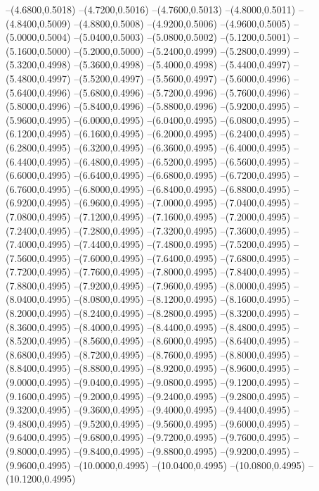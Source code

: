 {	--(4.6800,0.5018)
	--(4.7200,0.5016)
	--(4.7600,0.5013)
	--(4.8000,0.5011)
	--(4.8400,0.5009)
	--(4.8800,0.5008)
	--(4.9200,0.5006)
	--(4.9600,0.5005)
	--(5.0000,0.5004)
	--(5.0400,0.5003)
	--(5.0800,0.5002)
	--(5.1200,0.5001)
	--(5.1600,0.5000)
	--(5.2000,0.5000)
	--(5.2400,0.4999)
	--(5.2800,0.4999)
	--(5.3200,0.4998)
	--(5.3600,0.4998)
	--(5.4000,0.4998)
	--(5.4400,0.4997)
	--(5.4800,0.4997)
	--(5.5200,0.4997)
	--(5.5600,0.4997)
	--(5.6000,0.4996)
	--(5.6400,0.4996)
	--(5.6800,0.4996)
	--(5.7200,0.4996)
	--(5.7600,0.4996)
	--(5.8000,0.4996)
	--(5.8400,0.4996)
	--(5.8800,0.4996)
	--(5.9200,0.4995)
	--(5.9600,0.4995)
	--(6.0000,0.4995)
	--(6.0400,0.4995)
	--(6.0800,0.4995)
	--(6.1200,0.4995)
	--(6.1600,0.4995)
	--(6.2000,0.4995)
	--(6.2400,0.4995)
	--(6.2800,0.4995)
	--(6.3200,0.4995)
	--(6.3600,0.4995)
	--(6.4000,0.4995)
	--(6.4400,0.4995)
	--(6.4800,0.4995)
	--(6.5200,0.4995)
	--(6.5600,0.4995)
	--(6.6000,0.4995)
	--(6.6400,0.4995)
	--(6.6800,0.4995)
	--(6.7200,0.4995)
	--(6.7600,0.4995)
	--(6.8000,0.4995)
	--(6.8400,0.4995)
	--(6.8800,0.4995)
	--(6.9200,0.4995)
	--(6.9600,0.4995)
	--(7.0000,0.4995)
	--(7.0400,0.4995)
	--(7.0800,0.4995)
	--(7.1200,0.4995)
	--(7.1600,0.4995)
	--(7.2000,0.4995)
	--(7.2400,0.4995)
	--(7.2800,0.4995)
	--(7.3200,0.4995)
	--(7.3600,0.4995)
	--(7.4000,0.4995)
	--(7.4400,0.4995)
	--(7.4800,0.4995)
	--(7.5200,0.4995)
	--(7.5600,0.4995)
	--(7.6000,0.4995)
	--(7.6400,0.4995)
	--(7.6800,0.4995)
	--(7.7200,0.4995)
	--(7.7600,0.4995)
	--(7.8000,0.4995)
	--(7.8400,0.4995)
	--(7.8800,0.4995)
	--(7.9200,0.4995)
	--(7.9600,0.4995)
	--(8.0000,0.4995)
	--(8.0400,0.4995)
	--(8.0800,0.4995)
	--(8.1200,0.4995)
	--(8.1600,0.4995)
	--(8.2000,0.4995)
	--(8.2400,0.4995)
	--(8.2800,0.4995)
	--(8.3200,0.4995)
	--(8.3600,0.4995)
	--(8.4000,0.4995)
	--(8.4400,0.4995)
	--(8.4800,0.4995)
	--(8.5200,0.4995)
	--(8.5600,0.4995)
	--(8.6000,0.4995)
	--(8.6400,0.4995)
	--(8.6800,0.4995)
	--(8.7200,0.4995)
	--(8.7600,0.4995)
	--(8.8000,0.4995)
	--(8.8400,0.4995)
	--(8.8800,0.4995)
	--(8.9200,0.4995)
	--(8.9600,0.4995)
	--(9.0000,0.4995)
	--(9.0400,0.4995)
	--(9.0800,0.4995)
	--(9.1200,0.4995)
	--(9.1600,0.4995)
	--(9.2000,0.4995)
	--(9.2400,0.4995)
	--(9.2800,0.4995)
	--(9.3200,0.4995)
	--(9.3600,0.4995)
	--(9.4000,0.4995)
	--(9.4400,0.4995)
	--(9.4800,0.4995)
	--(9.5200,0.4995)
	--(9.5600,0.4995)
	--(9.6000,0.4995)
	--(9.6400,0.4995)
	--(9.6800,0.4995)
	--(9.7200,0.4995)
	--(9.7600,0.4995)
	--(9.8000,0.4995)
	--(9.8400,0.4995)
	--(9.8800,0.4995)
	--(9.9200,0.4995)
	--(9.9600,0.4995)
	--(10.0000,0.4995)
	--(10.0400,0.4995)
	--(10.0800,0.4995)
	--(10.1200,0.4995)
}
